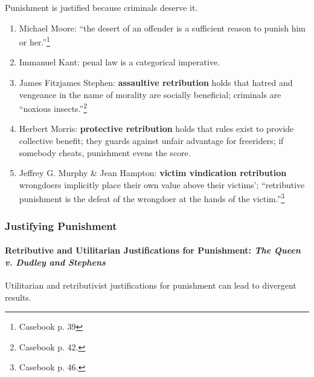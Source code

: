 Punishment is justified because criminals deserve it.

\begin{enumerate}
    \item Michael Moore: ``the desert of an offender is a sufficient reason to 
    punish him or her.''\footnote{Casebook p. 39}
    \item Immanuel Kant: penal law is a categorical imperative.
    \item James Fitzjames Stephen: \textbf{assaultive retribution} holds that 
    hatred and vengeance in the name of morality are socially beneficial; 
    criminals are ``noxious insects.''\footnote{Casebook p. 42.}
    \item Herbert Morris: \textbf{protective retribution} holds that rules 
    exist to provide collective benefit; they guards against unfair advantage 
    for freeriders; if somebody cheats, punishment evens the score.
    \item Jeffrey G. Murphy \& Jean Hampton: \textbf{victim vindication 
    retribution} wrongdoers implicitly place their own value above their 
    victims'; ``retributive punishment is the defeat of the wrongdoer at the 
    hands of the victim.''\footnote{Casebook p. 46.}
\end{enumerate}

\subsubsection{Justifying Punishment}

\paragraph{Retributive and Utilitarian Justifications for Punishment: 
\emph{The Queen v. Dudley and Stephens}}

Utilitarian and retributivist justifications for punishment can lead to 
divergent results.

